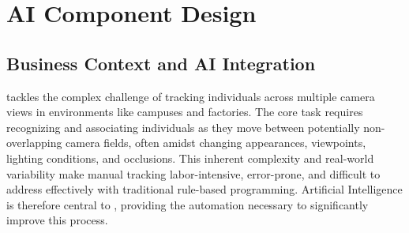 \chapter{AI Component Design}
\label{chap:ai-component-design}

\section{Business Context and AI Integration}
\label{section:business_context}
\usevar{\srsTitle} tackles the complex challenge of tracking individuals across multiple camera views in environments like campuses and factories. The core task requires recognizing and associating individuals as they move between potentially non-overlapping camera fields, often amidst changing appearances, viewpoints, lighting conditions, and occlusions. This inherent complexity and real-world variability make manual tracking labor-intensive, error-prone, and difficult to address effectively with traditional rule-based programming. Artificial Intelligence is therefore central to \usevar{\srsTitle}, providing the automation necessary to significantly improve this process.

